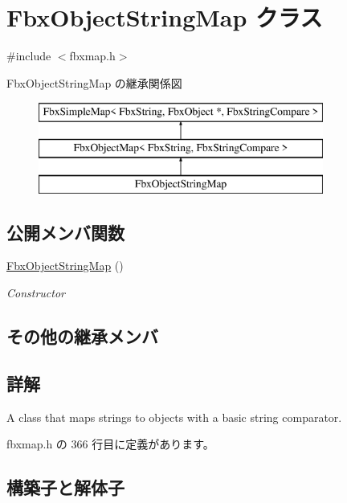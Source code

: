 \hypertarget{class_fbx_object_string_map}{}\section{Fbx\+Object\+String\+Map クラス}
\label{class_fbx_object_string_map}


{\ttfamily \#include $<$fbxmap.\+h$>$}

Fbx\+Object\+String\+Map の継承関係図\begin{figure}[H]
\begin{center}
\leavevmode
\includegraphics[height=3.000000cm]{class_fbx_object_string_map}
\end{center}
\end{figure}
\subsection*{公開メンバ関数}
\begin{DoxyCompactItemize}
\item 
\hyperlink{class_fbx_object_string_map_a6a4b36100241a2c021254bb1d8edb332}{Fbx\+Object\+String\+Map} ()
\begin{DoxyCompactList}\small\item\em Constructor \end{DoxyCompactList}\end{DoxyCompactItemize}
\subsection*{その他の継承メンバ}


\subsection{詳解}
A class that maps strings to objects with a basic string comparator. 

 fbxmap.\+h の 366 行目に定義があります。



\subsection{構築子と解体子}
\mbox{\label{class_fbx_object_string_map_a6a4b36100241a2c021254bb1d8edb332}} 
